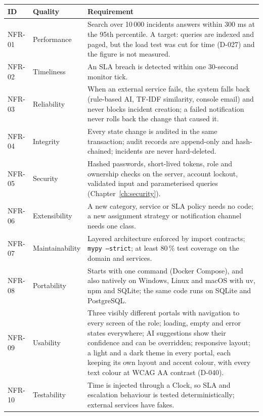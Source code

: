 \begin{longtable}{@{}l>{\raggedright\arraybackslash}p{3cm}>{\raggedright\arraybackslash}p{8.6cm}@{}}
\toprule
\textbf{ID} & \textbf{Quality} & \textbf{Requirement} \\
\midrule
\endhead
NFR-01 & Performance & Search over 10\,000 incidents answers within 300 ms at the 95th
  percentile. A target: queries are indexed and paged, but the load test was cut for time
  (D-027) and the figure is not measured. \\
NFR-02 & Timeliness & An SLA breach is detected within one 30-second monitor tick. \\
NFR-03 & Reliability & When an external service fails, the system falls back (rule-based AI,
  TF-IDF similarity, console email) and never blocks incident creation; a failed notification
  never rolls back the change that caused it. \\
NFR-04 & Integrity & Every state change is audited in the same transaction; audit records are
  append-only and hash-chained; incidents are never hard-deleted. \\
NFR-05 & Security & Hashed passwords, short-lived tokens, role and ownership checks on the
  server, account lockout, validated input and parameterised queries
  (Chapter~\ref{ch:security}). \\
NFR-06 & Extensibility & A new category, service or SLA policy needs no code; a new assignment
  strategy or notification channel needs one class. \\
NFR-07 & Maintainability & Layered architecture enforced by import contracts; \texttt{mypy
  --strict}; at least 80\,\% test coverage on the domain and services. \\
NFR-08 & Portability & Starts with one command (Docker Compose), and also natively on Windows,
  Linux and macOS with uv, npm and SQLite; the same code runs on SQLite and PostgreSQL. \\
NFR-09 & Usability & Three visibly different portals with navigation to every screen of the
  role; loading, empty and error states everywhere; AI suggestions show their confidence and
  can be overridden; responsive layout; a light and a dark theme in every portal, each
  keeping its own layout and accent colour, with every text colour at WCAG AA contrast (D-040). \\
NFR-10 & Testability & Time is injected through a Clock, so SLA and escalation behaviour is
  tested deterministically; external services have fakes. \\
\bottomrule
\end{longtable}

